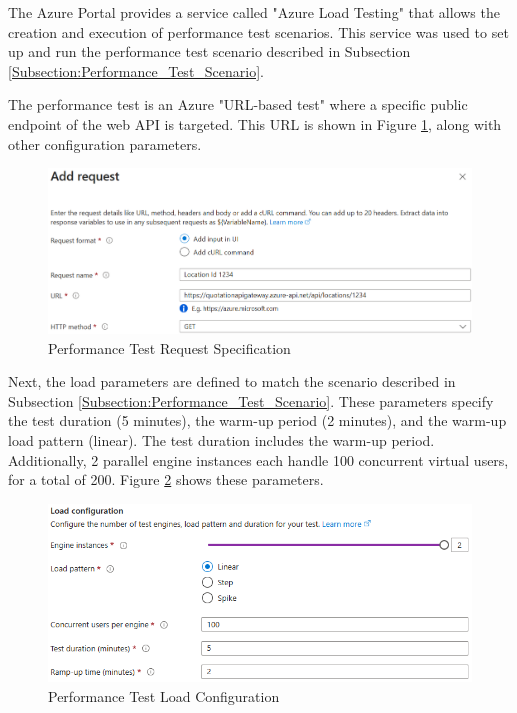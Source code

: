 \documentclass[12pt, reqno, oneside]{amsbook}
\theoremstyle{definition}
\theoremstyle{definition}
\numberwithin{section}{chapter}
\numberwithin{table}{chapter}
\numberwithin{figure}{chapter}
\begin{document}
The Azure Portal provides a service called "Azure Load Testing" that allows the creation and execution of performance test scenarios. This service was used to set up and run the performance test scenario described in Subsection \ref{Subsection:Performance_Test_Scenario}.

The performance test is an Azure "URL-based test" where a specific public endpoint of the web \ac{API} is targeted. This \ac{URL} is shown in Figure \ref{Figure:LoadTestingRequestSpecification}, along with other configuration parameters.

\begin{figure}[H]
  \centering
  \includegraphics[width=1\linewidth]{images/LoadTestingRequestSpecification.png}
  \caption{\label{Figure:LoadTestingRequestSpecification}Performance Test Request Specification}
\end{figure}

Next, the load parameters are defined to match the scenario described in Subsection \ref{Subsection:Performance_Test_Scenario}. These parameters specify the test duration (5 minutes), the warm-up period (2 minutes), and the warm-up load pattern (linear). The test duration includes the warm-up period. Additionally, 2 parallel engine instances each handle 100 concurrent virtual users, for a total of 200. Figure \ref{Figure:LoadTestingLoadConfiguration} shows these parameters.

\begin{figure}[H]
  \centering
  \includegraphics[width=0.9\linewidth]{images/LoadTestingLoadConfiguration.png}
  \caption{\label{Figure:LoadTestingLoadConfiguration}Performance Test Load Configuration}
\end{figure}
\end{document}
